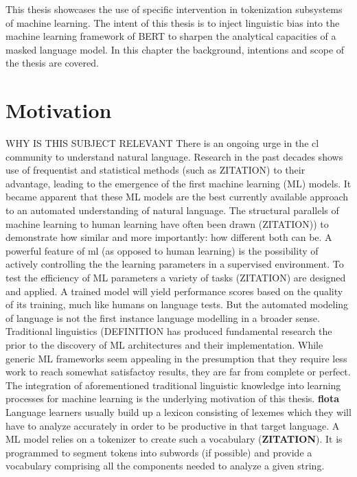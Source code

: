 
This thesis showcases the use of specific intervention in tokenization subsystems of machine learning.
The intent of this thesis is to inject linguistic bias into the machine learning framework of BERT to sharpen the analytical capacities of a masked language model.
In this chapter the background, intentions and scope of the thesis are covered.


\section{Motivation}
\label{sec:motivation}
\uppercase{Why is this subject relevant}
There is an ongoing urge in the \acf{cl} community to understand natural language.
Research in the past decades shows use of frequentist and statistical methods (such as \uppercase{ZITATION}) to their advantage, leading to the emergence of the first machine learning (ML) models.
It became apparent that these ML models are the best currently available approach to an automated understanding of natural language.
The structural parallels of machine learning to human learning have often been drawn (\uppercase{zitation)}) to demonstrate how similar and more importantly: how different both can be.
A powerful feature of \ac{ml} (as opposed to human learning) is the possibility of actively controlling the the learning parameters in a supervised environment.
To test the efficiency of \uppercase{ML} parameters a variety of tasks (\uppercase{zitation}) are designed and applied.
A trained model will yield performance scores based on the quality of its training, much like humans on language tests.
But the automated modeling of language is not the first instance language modelling in a broader sense.
Traditional linguistics (\uppercase{definition} has produced fundamental research the prior to the discovery of \uppercase{ML} architectures and their implementation.
While generic ML frameworks seem appealing in the presumption that they require less work to reach somewhat satisfactoy results,
they are far from complete or perfect.
The integration of aforementioned traditional linguistic knowledge into learning processes for machine learning is the underlying motivation of this thesis.
\textbf{flota} \cite{FLOTA}
Language learners usually build up a lexicon consisting of lexemes which they will have to analyze accurately in order to be productive in that target language.
A ML model relies on a tokenizer to create such a vocabulary  (\textbf{ZITATION}).
It is programmed to segment tokens into subwords (if possible) and provide a vocabulary comprising all the components needed to analyze a given string.
